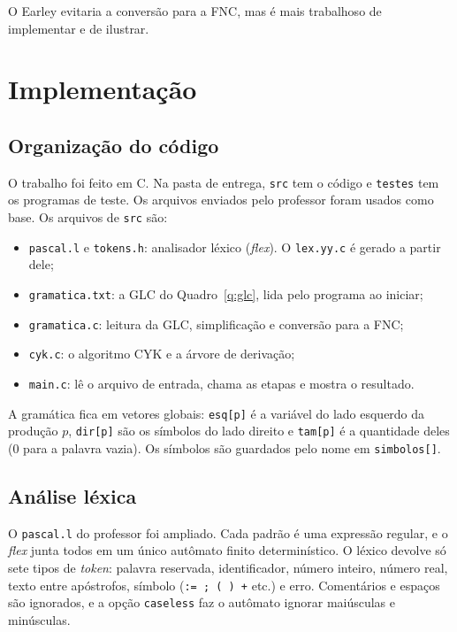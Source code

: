 \documentclass[12pt,a4paper]{article}
\newcommand{\code}[1]{\texttt{#1}}
\begin{document}
O Earley evitaria a conversão para a FNC, mas é mais trabalhoso de implementar e de ilustrar.

\section{Implementação}

\subsection{Organização do código}

O trabalho foi feito em C. Na pasta de entrega, \code{src} tem o código e \code{testes} tem os
programas de teste. Os arquivos enviados pelo professor foram usados como base. Os arquivos de
\code{src} são:

\begin{itemize}[nosep]
  \item \code{pascal.l} e \code{tokens.h}: analisador léxico (\textit{flex}). O \code{lex.yy.c} é
        gerado a partir dele;
  \item \code{gramatica.txt}: a GLC do Quadro~\ref{q:glc}, lida pelo programa ao iniciar;
  \item \code{gramatica.c}: leitura da GLC, simplificação e conversão para a FNC;
  \item \code{cyk.c}: o algoritmo CYK e a árvore de derivação;
  \item \code{main.c}: lê o arquivo de entrada, chama as etapas e mostra o resultado.
\end{itemize}

A gramática fica em vetores globais: \code{esq[p]} é a variável do lado esquerdo da produção
$p$, \code{dir[p]} são os símbolos do lado direito e \code{tam[p]} é a quantidade deles
(0 para a palavra vazia). Os símbolos são guardados pelo nome em \code{simbolos[]}.

\subsection{Análise léxica}

O \code{pascal.l} do professor foi ampliado. Cada padrão é uma expressão regular, e o
\textit{flex} junta todos em um único autômato finito determinístico. O léxico devolve só sete
tipos de \textit{token}: palavra reservada, identificador, número inteiro, número real, texto
entre apóstrofos, símbolo (\code{:= ; ( ) +} etc.) e erro. Comentários e espaços são ignorados,
e a opção \code{caseless} faz o autômato ignorar maiúsculas e minúsculas.
\end{document}
